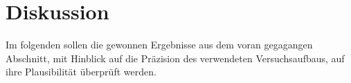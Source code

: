\section{Diskussion}

Im folgenden sollen die gewonnen Ergebnisse aus dem voran gegagangen Abschnitt, mit Hinblick auf die Präzision
des verwendeten Versuchsaufbaus, auf ihre Plausibilität überprüft werden.  
